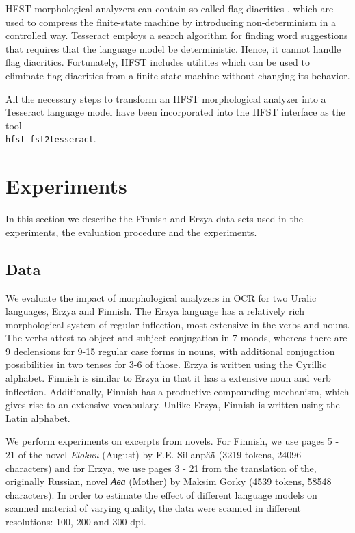 \documentclass[b5paper]{article}
\begin{document}
HFST morphological analyzers can contain so called flag diacritics
\cite{beesley03}, which are used to compress the finite-state machine
by introducing non-determinism in a controlled way. Tesseract employs
a search algorithm for finding word suggestions that requires that
the language model be deterministic. Hence, it cannot handle flag
diacritics. Fortunately, HFST includes utilities which can be used to
eliminate flag diacritics from a finite-state machine without
changing its behavior.

All the necessary steps to transform an HFST morphological analyzer
into a Tesseract language model have been incorporated into the HFST
interface as the tool\\{\tt hfst-fst2tesseract}.

\section{Experiments}
\label{exp}

In this section we describe the Finnish and Erzya data sets used in
the experiments, the evaluation procedure and the experiments.

\subsection{Data}
We evaluate the impact of morphological analyzers in OCR for two
Uralic languages, Erzya and Finnish. 
The Erzya language has a relatively rich morphological system of
regular inflection, most extensive in the verbs and nouns. The verbs
attest to object and subject conjugation in 7 moods, whereas there are
9 declensions for 9-15 regular case forms in nouns, with additional
conjugation possibilities in two tenses for 3-6 of those. Erzya is
written using the Cyrillic alphabet.
Finnish is similar to Erzya in that it has a extensive noun and verb
inflection. Additionally, Finnish has a productive compounding
mechanism, which gives rise to an extensive vocabulary. Unlike Erzya,
Finnish is written using the Latin alphabet.

We perform experiments on excerpts from novels.
For Finnish, we use pages 5 - 21 of the novel {\it Elokuu} (August) by
F.E. Sillanp\"{a}\"{a} \cite{sillanpaa08} (3219 tokens, 24096
characters) and for Erzya, we use pages 3 - 21 from the translation of
the, originally Russian, novel {\it Ава} (Mother) by Maksim Gorky
\cite{gorki} (4539 tokens, 58548 characters). In order to estimate the
effect of different language models on scanned material of varying
quality, the data were scanned in different resolutions: 100, 200 and
300 dpi.
\end{document}
